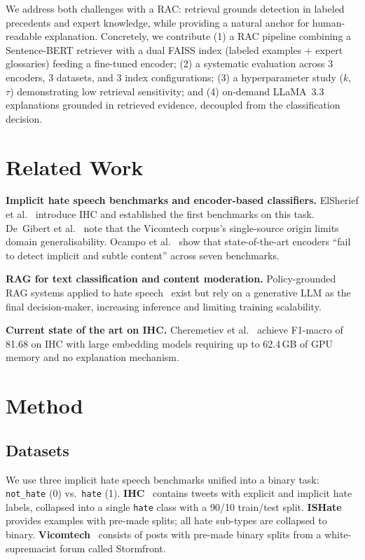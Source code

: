 \documentclass{article}
\begin{document}
We address both challenges with a RAC: retrieval grounds detection in labeled precedents and expert knowledge, while providing a natural anchor for human-readable explanation. Concretely, we contribute (1) a RAC pipeline combining a Sentence-BERT retriever \cite{reimers2019sbert} with a dual FAISS index (labeled examples + expert glossaries) feeding a fine-tuned encoder; (2) a systematic evaluation across 3 encoders, 3 datasets, and 3 index configurations; (3) a hyperparameter study ($k$, $\tau$) demonstrating low retrieval sensitivity; and (4) on-demand LLaMA~3.3 explanations grounded in retrieved evidence, decoupled from the classification decision.


\section{Related Work}
\label{sec:related_work}

\textbf{Implicit hate speech benchmarks and encoder-based classifiers.}
ElSherief et al.~\cite{elsherief2021latent} introduce IHC and established the first benchmarks on this task.
De~Gibert et al.~\cite{degibert2018hate} note that the Vicomtech corpus's single-source origin limits domain generalisability.
Ocampo et al.~\cite{ocampo2023indepth} show that state-of-the-art encoders ``fail to detect implicit and subtle content'' across seven benchmarks.

\textbf{RAG for text classification and content moderation.}
Policy-grounded RAG systems applied to hate speech~\cite{mnassri2025rag} exist but rely on a generative LLM as the final decision-maker, increasing inference and limiting training scalability.

\textbf{Current state of the art on IHC.}
Cheremetiev et al.~\cite{cheremetiev2025specializing} achieve F1-macro of 81.68 on IHC with large embedding models requiring up to 62.4\,GB of GPU memory and no explanation mechanism.


\section{Method}
\label{sec:method}

\subsection{Datasets}
We use three implicit hate speech benchmarks unified into a binary task: \texttt{not\_hate} (0) vs.\ \texttt{hate} (1). \textbf{IHC}~\cite{elsherief2021latent} contains tweets with explicit and implicit hate labels, collapsed into a single \texttt{hate} class with a 90/10 train/test split. \textbf{ISHate}~\cite{ocampo2023indepth} provides examples with pre-made splits; all hate sub-types are collapsed to binary. \textbf{Vicomtech}~\cite{degibert2018hate} consists of posts with pre-made binary splits from a white-supremacist forum called Stormfront.
\end{document}
